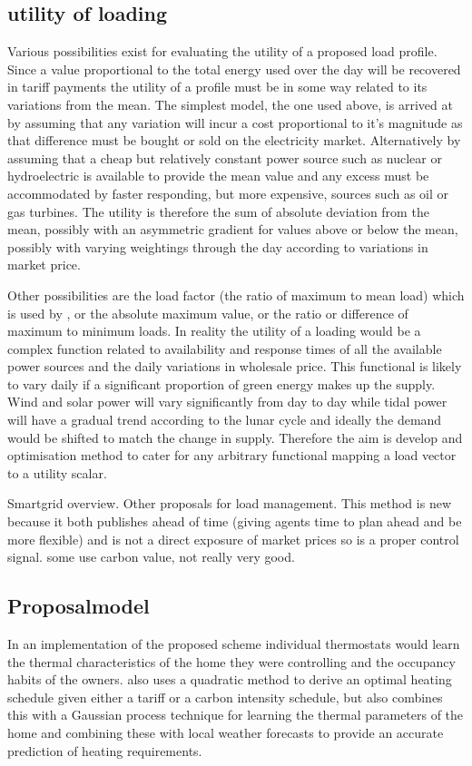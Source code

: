 \documentclass[a4paper, 10 pt, conference]{ieeeconf}  %
\begin{document}
\subsection{utility of loading}
\label{utilityofloading}
Various possibilities exist for evaluating the utility of a proposed load profile. Since a value proportional to the total energy used over the day will be recovered in tariff payments the utility of a profile must be in some way related to its variations from the mean. The simplest model, the one used above, is arrived at by assuming that any variation will incur a cost proportional to it's magnitude as that difference must be bought or sold on the electricity market. Alternatively by assuming that a cheap but relatively constant power source such as nuclear or hydroelectric is available to provide the mean value and any excess must be accommodated by faster responding, but more expensive, sources such as oil or gas turbines. The utility is therefore the sum of absolute deviation from the mean, possibly with an asymmetric gradient for values above or below the mean, possibly with varying weightings through the day according to variations in market price.

Other possibilities are the load factor (the ratio of maximum to mean load) which is used by \cite{ramchurn2011agent}, or the absolute maximum value, or the ratio or difference of maximum to minimum loads. In reality the utility of a loading would be a complex function related to availability and response times of all the available power sources and the daily variations in wholesale price. This functional is likely to vary daily if a significant proportion of green energy makes up the supply. Wind and solar power will vary significantly from day to day while tidal power will have a gradual trend according to the lunar cycle and ideally the demand would be shifted to match the change in supply. Therefore the aim is develop and optimisation method to cater for any arbitrary functional mapping a load vector to a utility scalar.

Smartgrid overview. Other proposals for load management. This method is new because it both publishes ahead of time (giving agents time to plan ahead and be more flexible) and is not a direct exposure of market prices so is a proper control signal. some use carbon value, not really very good.

\subsection{Proposalmodel}
In an implementation of the proposed scheme individual thermostats would learn the thermal characteristics of the home they were controlling and the occupancy habits of the owners. \cite{rogers2011adaptive} also uses a quadratic method to derive an optimal heating schedule given either a tariff or a carbon intensity schedule, but also combines this with a Gaussian process technique for learning the thermal parameters of the home and combining these with local weather forecasts to provide an accurate prediction of heating requirements.
\end{document}
